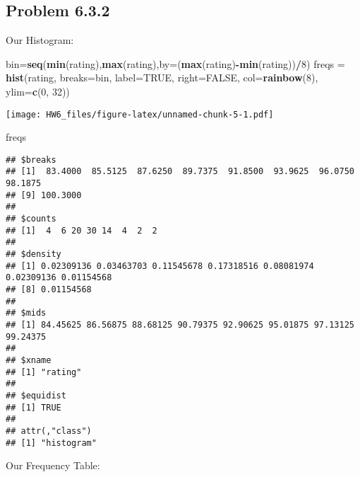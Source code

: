 \documentclass[
]{article}
\newenvironment{Shaded}{\begin{snugshade}}{\end{snugshade}}
\newcommand{\AttributeTok}[1]{\textcolor[rgb]{0.13,0.29,0.53}{#1}}
\newcommand{\ConstantTok}[1]{\textcolor[rgb]{0.56,0.35,0.01}{#1}}
\newcommand{\DecValTok}[1]{\textcolor[rgb]{0.00,0.00,0.81}{#1}}
\newcommand{\FunctionTok}[1]{\textcolor[rgb]{0.13,0.29,0.53}{\textbf{#1}}}
\newcommand{\NormalTok}[1]{#1}
\newcommand{\OtherTok}[1]{\textcolor[rgb]{0.56,0.35,0.01}{#1}}
\newcommand{\SpecialCharTok}[1]{\textcolor[rgb]{0.81,0.36,0.00}{\textbf{#1}}}
\begin{document}
\(~\)

\pagebreak

\subsection{Problem 6.3.2}\label{problem-6.3.2}

Our Histogram:

\begin{Shaded}
\begin{Highlighting}[]
\NormalTok{bin}\OtherTok{=}\FunctionTok{seq}\NormalTok{(}\FunctionTok{min}\NormalTok{(rating),}\FunctionTok{max}\NormalTok{(rating),}\AttributeTok{by=}\NormalTok{(}\FunctionTok{max}\NormalTok{(rating)}\SpecialCharTok{{-}}\FunctionTok{min}\NormalTok{(rating))}\SpecialCharTok{/}\DecValTok{8}\NormalTok{)}
\NormalTok{freqs }\OtherTok{=} \FunctionTok{hist}\NormalTok{(rating, }\AttributeTok{breaks=}\NormalTok{bin, }\AttributeTok{label=}\ConstantTok{TRUE}\NormalTok{, }\AttributeTok{right=}\ConstantTok{FALSE}\NormalTok{, }\AttributeTok{col=}\FunctionTok{rainbow}\NormalTok{(}\DecValTok{8}\NormalTok{), }\AttributeTok{ylim=}\FunctionTok{c}\NormalTok{(}\DecValTok{0}\NormalTok{, }\DecValTok{32}\NormalTok{))}
\end{Highlighting}
\end{Shaded}

\texttt{[image: HW6\_files/figure-latex/unnamed-chunk-5-1.pdf]}

\begin{Shaded}
\begin{Highlighting}[]
\NormalTok{freqs}
\end{Highlighting}
\end{Shaded}

\begin{verbatim}
## $breaks
## [1]  83.4000  85.5125  87.6250  89.7375  91.8500  93.9625  96.0750  98.1875
## [9] 100.3000
## 
## $counts
## [1]  4  6 20 30 14  4  2  2
## 
## $density
## [1] 0.02309136 0.03463703 0.11545678 0.17318516 0.08081974 0.02309136 0.01154568
## [8] 0.01154568
## 
## $mids
## [1] 84.45625 86.56875 88.68125 90.79375 92.90625 95.01875 97.13125 99.24375
## 
## $xname
## [1] "rating"
## 
## $equidist
## [1] TRUE
## 
## attr(,"class")
## [1] "histogram"
\end{verbatim}

Our Frequency Table:
\end{document}
